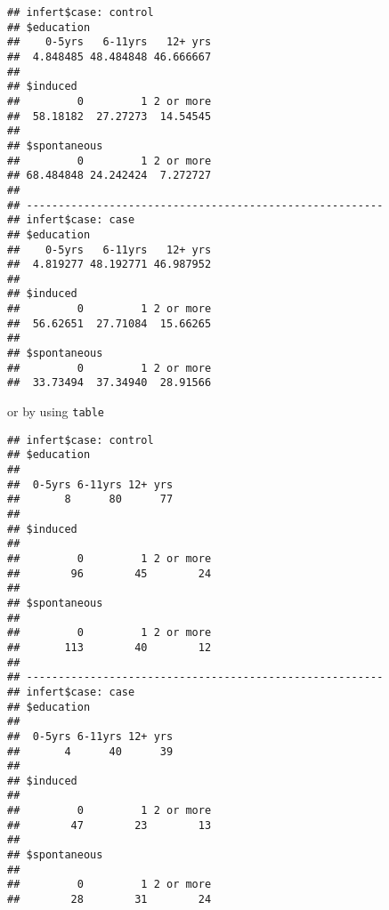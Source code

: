 \documentclass[]{book}
\newenvironment{Shaded}{\begin{snugshade}}{\end{snugshade}}
\newcommand{\KeywordTok}[1]{\textcolor[rgb]{0.13,0.29,0.53}{\textbf{{#1}}}}
\newcommand{\StringTok}[1]{\textcolor[rgb]{0.31,0.60,0.02}{{#1}}}
\newcommand{\NormalTok}[1]{{#1}}
\theoremstyle{definition}
\theoremstyle{definition}
\theoremstyle{remark}
\begin{document}
\begin{verbatim}
## infert$case: control
## $education
##    0-5yrs   6-11yrs   12+ yrs 
##  4.848485 48.484848 46.666667 
## 
## $induced
##         0         1 2 or more 
##  58.18182  27.27273  14.54545 
## 
## $spontaneous
##         0         1 2 or more 
## 68.484848 24.242424  7.272727 
## 
## -------------------------------------------------------- 
## infert$case: case
## $education
##    0-5yrs   6-11yrs   12+ yrs 
##  4.819277 48.192771 46.987952 
## 
## $induced
##         0         1 2 or more 
##  56.62651  27.71084  15.66265 
## 
## $spontaneous
##         0         1 2 or more 
##  33.73494  37.34940  28.91566
\end{verbatim}

or by using \texttt{table}

\begin{Shaded}
\end{Shaded}

\begin{verbatim}
## infert$case: control
## $education
## 
##  0-5yrs 6-11yrs 12+ yrs 
##       8      80      77 
## 
## $induced
## 
##         0         1 2 or more 
##        96        45        24 
## 
## $spontaneous
## 
##         0         1 2 or more 
##       113        40        12 
## 
## -------------------------------------------------------- 
## infert$case: case
## $education
## 
##  0-5yrs 6-11yrs 12+ yrs 
##       4      40      39 
## 
## $induced
## 
##         0         1 2 or more 
##        47        23        13 
## 
## $spontaneous
## 
##         0         1 2 or more 
##        28        31        24
\end{verbatim}

\begin{Shaded}
\end{Shaded}
\end{document}
